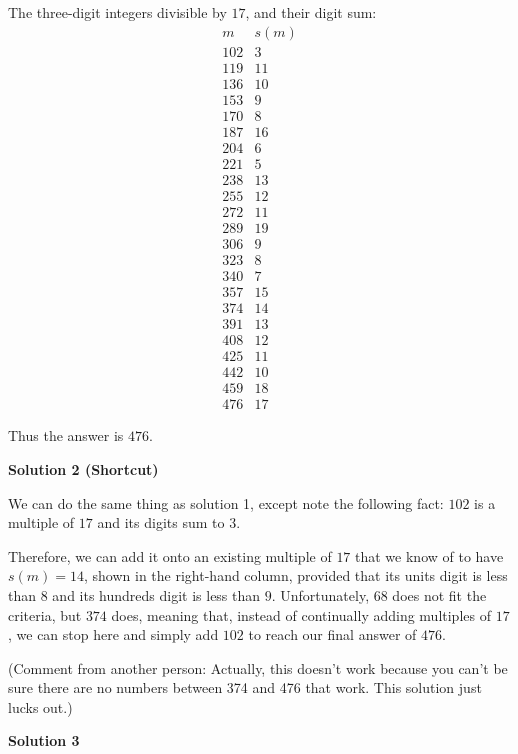 \begin{enumerate}
The three-digit integers divisible by $17$, and their digit sum: 
 \[\begin{array}{c|c} m & s(m)\\ \hline 102 & 3 \\ 119 & 11\\ 136 & 10\\ 153 & 9\\ 170 & 8\\ 187 & 16\\ 204 & 6\\ 221 & 5\\ 238 & 13\\ 255 & 12\\ 272 & 11\\ 289 & 19\\ 306 & 9\\ 323 & 8\\ 340 & 7\\ 357 & 15\\ 374 & 14\\ 391 & 13\\ 408 & 12\\ 425 & 11\\ 442 & 10\\ 459 & 18\\ 476 & 17 \end{array}\]

 Thus the answer is $\boxed{476}$.

 



\textbf{Solution 2 (Shortcut)}

We can do the same thing as solution 1, except note the following fact: $102$ is a multiple of $17$ and its digits sum to $3$. 

 Therefore, we can add it onto an existing multiple of $17$ that we know of to have $s(m) = 14$, shown in the right-hand column, provided that its units digit is less than $8$ and its hundreds digit is less than $9$. Unfortunately, $68$ does not fit the criteria, but $374$ does, meaning that, instead of continually adding multiples of $17$, we can stop here and simply add $102$ to reach our final answer of $\boxed{476}$.

 (Comment from another person: Actually, this doesn't work because you can't be sure there are no numbers between 374 and 476 that work. This solution just lucks out.)

 



\textbf{Solution 3}


\end{enumerate}
